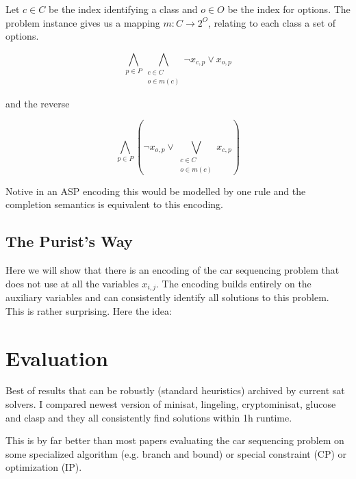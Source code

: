 \documentclass[]{llncs}
\begin{document}
Let $c \in C$ be the index identifying a class and $o\in O $ be the
index for options. The problem instance gives us a mapping $m :
C\rightarrow 2^O$, relating to each class a set of options. 

\begin{equation}
    \bigwedge_{p\in P} \bigwedge_{\substack{c \in C \\ o \in m(c)}}
    \neg x_{c,p} \vee x_{o,p}
\end{equation}

and the reverse

\begin{equation}
    \bigwedge_{p\in P} (\neg x_{o,p} \vee \bigvee_{\substack{c \in C \\
    o \in m(c)}} x_{c,p})
\end{equation}

Notive in an ASP encoding this would be modelled by one rule and the
completion semantics is equivalent to this encoding. 

\subsection{The Purist's Way}

Here we will show that there is an encoding of the car sequencing
problem that does not use at all the variables $x_{i,j}$. The encoding
builds entirely on the auxiliary variables and can consistently identify
all solutions to this problem. This is rather surprising. Here the idea: 

\section{Evaluation}

Best of results that can be robustly (standard heuristics) archived by
current sat solvers. I compared newest version of minisat, lingeling,
cryptominisat, glucose and clasp and they all consistently find
solutions within 1h runtime. 

\DTLsetseparator{,}

\begin{table}[htbp]
    \caption{}
    \centering
\end{table}


This is by far better than most papers evaluating the car sequencing
problem on some specialized algorithm (e.g. branch and bound) or special
constraint (CP) or optimization (IP). 
\end{document}

